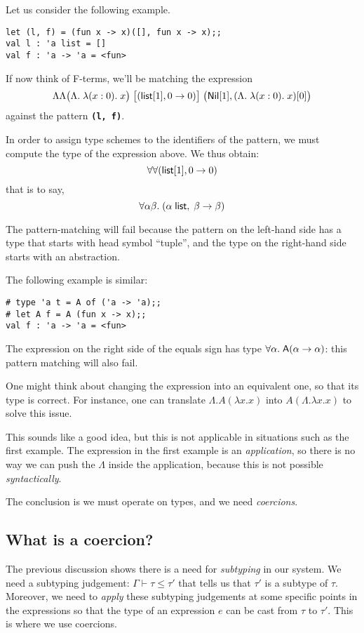 \documentclass[10pt,a4paper,twoside,titlepage,twocolumn]{article}
\newcommand{\code}[1]{\textbf{\texttt{#1}}}
\begin{document}
Let us consider the following example.

\begin{verbatim}
let (l, f) = (fun x -> x)([], fun x -> x);;
val l : 'a list = []
val f : 'a -> 'a = <fun>
\end{verbatim}

If now think of F-terms, we'll be matching the expression
$$\Lambda\Lambda \big(\Lambda.\;\lambda (x: 0).\; x\big)
\;\big[(\text{\textsf{list}}[1], 0\to0)\big]
\;\big(\text{\textsf{Nil}}[1], (\Lambda.\;\lambda (x: 0).\; x) [0]\big)
$$
against the pattern \code{(l, f)}.

In order to assign type schemes to the identifiers of the pattern, we must
compute the type of the expression above. We thus obtain:
$$\forall\forall(\text{\textsf{list}}[1],0\to0)$$
that is to say,
$$\forall\alpha\beta.\; (\alpha\;\text{\textsf{list}},\;\beta\to\beta)$$

The pattern-matching will fail because the pattern on the left-hand
side has a type that starts with head symbol ``tuple'', and the type on
the right-hand side starts with an abstraction.

The following example is similar:

\begin{verbatim}
# type 'a t = A of ('a -> 'a);;
# let A f = A (fun x -> x);;
val f : 'a -> 'a = <fun>
\end{verbatim}

The expression on the right side of the
equals sign has type $\forall\alpha.\; \text{\textsf{A}} (\alpha\to\alpha)$: this pattern matching will also fail.

One might think about changing the expression into an equivalent one, so that
its type is correct. For instance, one can translate
$\Lambda.  A(\lambda x. x)$ into $A (\Lambda.\lambda x. x)$ to solve this issue.

This sounds like a good idea, but this is not applicable in situations such as
the first example. The expression in the first example is an
\emph{application}, so there is no way we can push the $\Lambda$ inside the
application, because this is not possible \emph{syntactically}.

The conclusion is we must operate on types, and we need \emph{coercions}.

\subsection{What is a coercion?}

The previous discussion shows there is a need for \emph{subtyping} in our
system. We need a subtyping judgement: $\Gamma \vdash \tau \leq \tau'$ that tells us
that $\tau'$ is a subtype of $\tau$. Moreover, we need to \emph{apply} these subtyping
judgements at some specific points in the expressions so that the type of an
expression $e$ can be cast from $\tau$ to $\tau'$. This is where we use coercions.
\end{document}
